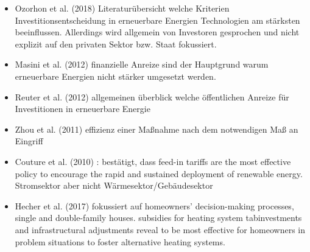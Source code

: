 \begin{itemize}
	\item Ozorhon et al. (2018) \cite{ozorhon2018generating} Literaturübersicht welche Kriterien Investitionsentscheidung in erneuerbare Energien Technologien am stärksten beeinflussen. Allerdings wird allgemein von Investoren gesprochen und nicht explizit auf den privaten Sektor bzw. Staat fokussiert. 
	\item Masini et al. (2012) \cite{masini2012impact} finanzielle Anreize sind der Hauptgrund warum erneuerbare Energien nicht stärker umgesetzt werden.	
	\item Reuter et al. (2012) \cite{reuter2012renewable} allgemeinen überblick welche öffentlichen Anreize für Investitionen in erneuerbare Energie	
	\item Zhou et al. (2011) \cite{zhou2011designing} effizienz einer Maßnahme nach dem notwendigen Maß an Eingriff
	\item Couture et al. (2010) \cite{couture2010analysis}: bestätigt, dass feed-in tariffs are the most effective policy to encourage the rapid and sustained deployment of renewable energy. Stromsektor aber nicht Wärmesektor/Gebäudesektor
	\item Hecher et al. (2017) \cite{hecher2017trigger} fokussiert auf homeowners’ decision-making processes, single and double-family houses. subsidies for heating system tabinvestments and infrastructural adjustments reveal to be most effective for homeowners in problem situations to foster alternative heating systems.
\end{itemize}

